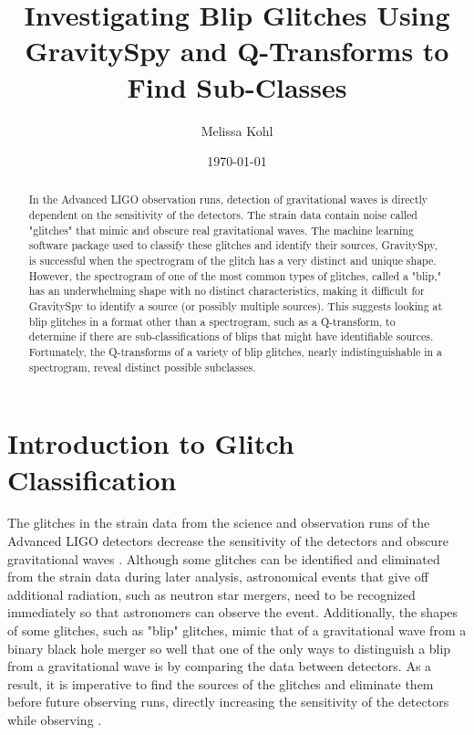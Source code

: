 \documentclass[a4paper]{article}
\title{Investigating Blip Glitches Using GravitySpy and Q-Transforms to Find Sub-Classes}
\author{Melissa Kohl}
\date{\today}
\begin{document}
\maketitle
\graphicspath{ {images/} }

\begin{abstract}

In the Advanced LIGO observation runs, detection of gravitational waves is directly dependent on the sensitivity of the detectors. The strain data contain noise called "glitches" that mimic and obscure real gravitational waves. The machine learning software package used to classify these glitches and identify their sources, GravitySpy, is successful when the spectrogram of the glitch has a very distinct and unique shape. However, the spectrogram of one of the most common types of glitches, called a "blip," has an underwhelming shape with no distinct characteristics, making it difficult for GravitySpy to identify a source (or possibly multiple sources). This suggests looking at blip glitches in a format other than a spectrogram, such as a Q-transform, to determine if there are sub-classifications of blips that might have identifiable sources. Fortunately, the Q-transforms of a variety of blip glitches, nearly indistinguishable in a spectrogram, reveal distinct possible subclasses.

\end{abstract}

\section{Introduction to Glitch Classification} \label{introduction}

The glitches in the strain data from the science and observation runs of the Advanced LIGO detectors decrease the sensitivity of the detectors and obscure gravitational waves \cite{Zevin:2016}. Although some glitches can be identified and eliminated from the strain data during later analysis, astronomical events that give off additional radiation, such as neutron star mergers, need to be recognized immediately so that astronomers can observe the event. Additionally, the shapes of some glitches, such as "blip" glitches, mimic that of a gravitational wave from a binary black hole merger so well that one of the only ways to distinguish a blip from a gravitational wave is by comparing the data between detectors. As a result, it is imperative to find the sources of the glitches and eliminate them before future observing runs, directly increasing the sensitivity of the detectors while observing \cite{Mukherjee:2010}. 
\end{document}
